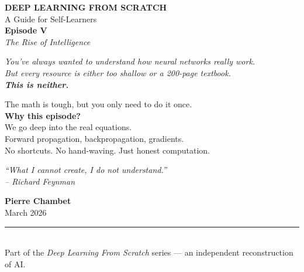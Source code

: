 \documentclass[11pt]{article}
\begin{document}
\begin{titlepage}
    \centering
    \vspace*{2.2cm}

    {\Large \textbf{DEEP LEARNING FROM SCRATCH}}\\[0.4em]
    A Guide for Self-Learners\\[2.5em]

    {\Huge \bfseries Episode V}\\[0.4em]
    {\LARGE \textit{The Rise of Intelligence}}\\[2em]

    \vspace{0.8cm}

    {\large\itshape
    You've always wanted to understand how neural networks really work.\\
    But every resource is either too shallow or a 200-page textbook.\\[0.8em]
    {\Large \textbf{This is neither.}}
    }

    \vspace{0.8cm}

    \begin{tcolorbox}[colback=black!3!white, colframe=black!20!white, width=0.8\textwidth, sharp corners, boxrule=0.4pt]
    \centering
    \itshape

    {\Large The math is tough, but you only need to do it once.}\\[1em]

    \textbf{Why this episode?}\\[0.3em]
    We go deep into the real equations.\\
    Forward propagation, backpropagation, gradients.\\
    No shortcuts. No hand-waving. Just honest computation.
    \end{tcolorbox}

    \vspace{1.5cm}

    \begin{center}
    \itshape
        {\Large \textit{``What I cannot create, I do not understand.''}}\\
        \vspace{0.2em}
        {\large -- Richard Feynman}
    \end{center}

    \vfill

    {\large \textbf{Pierre Chambet}}\\[0.3em]
    {\small March 2026}\\[1em]
    \rule{0.8\textwidth}{0.4pt}\\[0.4em]
    {\small Part of the \textit{Deep Learning From Scratch} series --- an independent reconstruction of AI.}

\end{titlepage}
\end{document}
